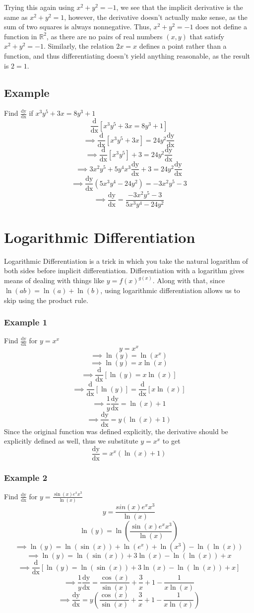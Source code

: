 \documentclass[oneside]{book}
\newcommand\tab[1][1cm]{\hspace*{#1}}
\newcommand\nextline{\newline\tab}
\newcommand\ddx[1]{\frac{\text{d}}{\text{dx}}\left[#1\right]}
\newcommand\dydx{\frac{\text{dy}}{\text{dx}}}
\begin{document}
\newpage
Trying this again using $x^2+y^2=-1$, we see that the implicit derivative is the same as $x^2+y^2=1$, however, the derivative doesn't actually make sense, as the sum of two squares is always nonnegative. Thus, $x^2+y^2=-1$ does not define a function in $\mathbb{R}^2$, as there are no pairs of real numbers $(x,y)$ that satisfy $x^2+y^2=-1$.
\nextline
Similarly, the relation $2x=x$ defines a point rather than a function, and thus differentiating doesn't yield anything reasonable, as the result is $2=1$. 
\section{Example}
\tab
Find $\dydx$ if $x^3y^5+3x=8y^3+1$
$$\ddx{x^3y^5+3x=8y^3+1}$$
$$\implies \ddx{x^3y^5+3x} = 24y^2\dydx$$
$$\implies \ddx{x^3y^5} + 3 = 24y^2\dydx$$
$$\implies 3x^2y^5 + 5y^4x^3\dydx + 3 = 24y^2\dydx$$
$$\implies \dydx\left(5x^3y^4-24y^2\right)=-3x^2y^5-3$$
$$\implies \dydx=\frac{-3x^2y^5-3}{5x^3y^4-24y^2}$$
\chapter{Logarithmic Differentiation}
\tab
Logarithmic Differentiation is a trick in which you take the natural logarithm of both sides before implicit differentiation.
\nextline
Differentiation with a logarithm gives means of dealing with things like $y=f(x)^{g(x)}$. Along with that, since $\ln(ab)=\ln(a)+\ln(b)$, using logarithmic differentiation allows us to skip using the product rule.
\subsection{Example 1}
Find $\dydx$ for $y=x^x$
\nextline
$$y=x^x$$
$$\implies \ln(y)=\ln(x^x)$$
$$\implies \ln(y)=x\ln(x)$$
$$\implies \ddx{\ln(y)=x\ln(x)}$$
$$\implies \ddx{\ln(y)}=\ddx{x\ln(x)}$$
$$\implies \frac{1}{y}\dydx = \ln(x)+1$$
$$\implies \dydx=y\left(\ln(x)+1\right)$$
\tab
Since the original function was defined explicitly, the derivative should be explicitly defined as well, thus we substitute $y=x^x$ to get
$$\dydx=x^x\left(\ln(x)+1\right)$$
\subsection{Example 2}
Find $\dydx$ for $y=\frac{\sin(x)e^xx^3}{\ln(x)}$
$$y=\frac{sin(x)e^xx^3}{\ln(x)}$$
$$\ln(y)=\ln\left(\frac{\sin(x)e^xx^3}{\ln(x)}\right)$$
$$\implies \ln(y)=\ln(\sin(x))+\ln(e^x)+\ln(x^3)-\ln(\ln(x))$$
$$\implies \ln(y)=\ln(\sin(x))+3\ln(x)-\ln(\ln(x)) + x$$
$$\implies \ddx{\ln(y)=\ln(\sin(x))+3\ln(x)-\ln(\ln(x)) + x}$$
$$\implies \frac{1}{y}\dydx = \frac{\cos(x)}{\sin(x)} + \frac{3}{x} + 1 - \frac{1}{x\ln(x)}$$
$$\implies \dydx=y\left(\frac{\cos(x)}{\sin(x)} + \frac{3}{x} + 1 - \frac{1}{x\ln(x)}\right)$$
\end{document}
